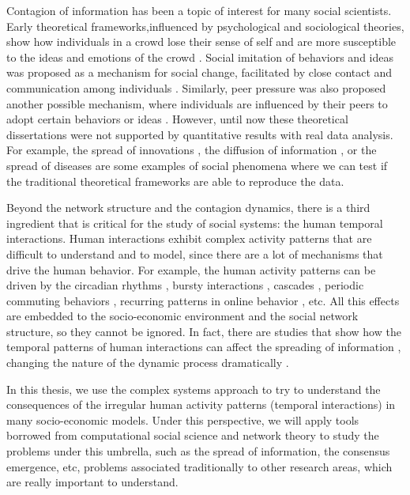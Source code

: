 Contagion of information has been a topic of interest for many social scientists. Early theoretical frameworks,influenced by psychological and sociological theories, show how individuals in a crowd lose their sense of self and are more susceptible to the ideas and emotions of the crowd \cite{le2023crowd}. Social imitation of behaviors and ideas was proposed as a mechanism for social change, facilitated by close contact and communication among individuals \cite{kanter-1971}. Similarly, peer pressure was also proposed another possible mechanism, where individuals are influenced by their peers to adopt certain behaviors or ideas \cite{granovetter-1978, brown-1986}. However, until now these theoretical dissertations were not supported by quantitative results with real data analysis. For example, the spread of innovations \cite{rogers2014}, the diffusion of information \cite{valente-1996}, or the spread of diseases \cite{anderson1991infectious} are some examples of social phenomena where we can test if the traditional theoretical frameworks are able to reproduce the data.

Beyond the network structure and the contagion dynamics, there is a third ingredient that is critical for the study of social systems: the human temporal interactions. Human interactions exhibit complex activity patterns that are difficult to understand and to model, since there are a lot of mechanisms that drive the human behavior. For example, the human activity patterns can be driven by the circadian rhythms \cite{roenneberg-2013}, bursty interactions \cite{Barabasi2005Bursts}, cascades \cite{watts-2002}, periodic commuting behaviors \cite{gonzalez2008understanding}, recurring patterns in online behavior \cite{Lazer2009CompSocSci}, etc. All this effects are embedded to the socio-economic environment and the social network structure, so they cannot be ignored. In fact, there are studies that show how the temporal patterns of human interactions can affect the spreading of information \cite{Holme2012Temporal}, changing the nature of the dynamic process dramatically \cite{karsai-2011}.

In this thesis, we use the complex systems approach to try to understand the consequences of the irregular human activity patterns (temporal interactions) in many socio-economic models. Under this perspective, we will apply tools borrowed from computational social science and network theory to study the problems under this umbrella, such as the spread of information, the consensus emergence, etc, problems associated traditionally to other research areas, which are really important to understand.

